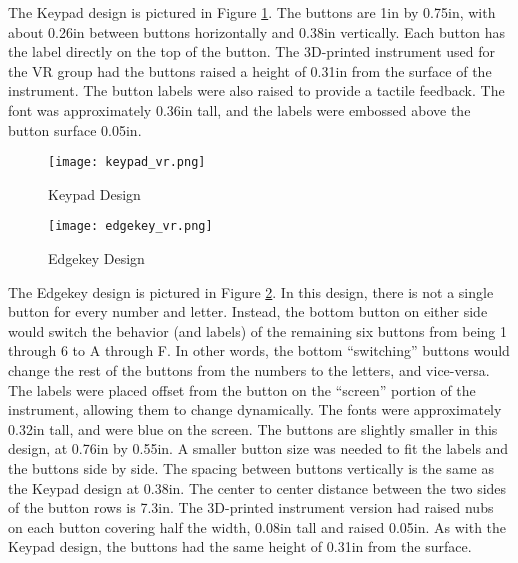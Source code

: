 The Keypad design is pictured in Figure \ref{fig:de_keypad_design}.
The buttons are 1in by 0.75in, with about 0.26in between buttons horizontally and 0.38in vertically.
Each button has the label directly on the top of the button.
The 3D-printed instrument used for the VR group had the buttons raised a height of 0.31in from the surface of the instrument.
The button labels were also raised to provide a tactile feedback.
The font was approximately 0.36in tall, and the labels were embossed above the button surface 0.05in.

\begin{figure}
    \centering
    \texttt{[image: keypad\_vr.png]}
    \caption{Keypad Design}
    \label{fig:de_keypad_design}
\end{figure}

\begin{figure}
    \centering
    \texttt{[image: edgekey\_vr.png]}
    \caption{Edgekey Design}
    \label{fig:de_edgekey_design}
\end{figure}

The Edgekey design is pictured in Figure \ref{fig:de_edgekey_design}.
In this design, there is not a single button for every number and letter.
Instead, the bottom button on either side would switch the behavior (and labels) of the remaining six buttons from being 1 through 6 to A through F.
In other words, the bottom ``switching'' buttons would change the rest of the buttons from the numbers to the letters, and vice-versa.
The labels were placed offset from the button on the ``screen'' portion of the instrument, allowing them to change dynamically.
The fonts were approximately 0.32in tall, and were blue on the screen.
The buttons are slightly smaller in this design, at 0.76in by 0.55in.
A smaller button size was needed to fit the labels and the buttons side by side.
The spacing between buttons vertically is the same as the Keypad design at 0.38in.
The center to center distance between the two sides of the button rows is 7.3in.
The 3D-printed instrument version had raised nubs on each button covering half the width, 0.08in tall and raised 0.05in.
As with the Keypad design, the buttons had the same height of 0.31in from the surface.

